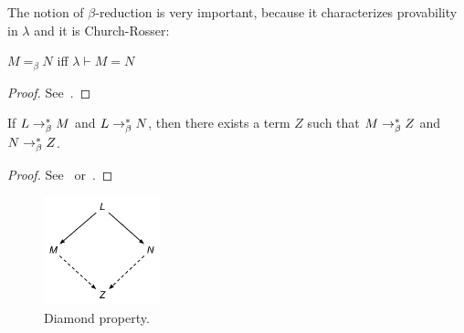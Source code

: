
%

The notion of $\beta$-reduction is very important, because it characterizes provability in $\lambda$ and it is Church-Rosser:

\begin{proposition} $M =_{\beta} N$ iff $\lambda \vdash M = N$
\end{proposition}
\begin{proof} See~\cite[p.59]{Barendregt:1981:The-Lambda-Calculus:-Its-Syntax-and-Semantics}.
\end{proof}


\begin{theorem} If $L \rightarrow^{*}_\beta M$ and $L \rightarrow^{*}_\beta N$, then there exists a term $Z$ such that $M \rightarrow^{*}_\beta Z$ and $N \rightarrow^{*}_\beta Z$.
\end{theorem}
\begin{proof} See~\cite[p.62]{Barendregt:1981:The-Lambda-Calculus:-Its-Syntax-and-Semantics} or~\cite[p.289]{HindleySeldin:2008:Lambda-Calculus-and-Combinators-an-Introduction}.
\end{proof}
\begin{figure}[h!]
  \centering
    \includegraphics[width=0.3\textwidth]{images/Diamond.pdf}
      \caption{Diamond property.} \label{fig:diamond}
\end{figure}

